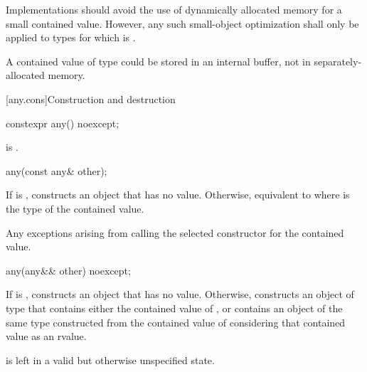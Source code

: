 \pnum
Implementations should avoid the use of dynamically allocated memory for a small contained value.
However, any such small-object optimization shall only be applied to types  for which
 is .
\begin{example}
A contained value of type  could be stored in an internal buffer,
not in separately-allocated memory.
\end{example}

[any.cons]{Construction and destruction}

%
\begin{itemdecl}
constexpr any() noexcept;
\end{itemdecl}

\begin{itemdescr}
\pnum
\ensures
{} is .
\end{itemdescr}

%
\begin{itemdecl}
any(const any& other);
\end{itemdecl}

\begin{itemdescr}
\pnum
\effects
If  is , constructs an object that has no value.
Otherwise, equivalent to 
where  is the type of the contained value.

\pnum
\throws
Any exceptions arising from calling the selected constructor for the contained value.
\end{itemdescr}

%
\begin{itemdecl}
any(any&& other) noexcept;
\end{itemdecl}

\begin{itemdescr}
\pnum
\effects
If  is , constructs an object that has no value.
Otherwise, constructs an object of type  that
contains either the contained value of , or
contains an object of the same type constructed from
the contained value of  considering that contained value as an rvalue.

\pnum
\ensures
{} is left in a valid but otherwise unspecified state.
\end{itemdescr}

